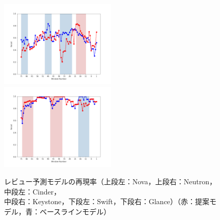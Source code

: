 \documentclass[11pt]{jreport}
\begin{document}
\begin{figure}[H]
\begin{minipage}{\textwidth}
\begin{center}
    \includegraphics[width=0.495\textwidth]{Uenaka_fig/RQ2_result/Swift_review_Recall.pdf}
    \includegraphics[width=0.495\textwidth]{Uenaka_fig/RQ2_result/Glance_review_Recall.pdf}
    \caption{レビュー予測モデルの再現率（上段左：Nova，上段右：Neutron，中段左：Cinder，\\ 中段右：Keystone，下段左：Swift，下段右：Glance）（赤：提案モデル，青：ベースラインモデル）}
    \label{fig:review_r}
\end{center}
\vspace{0.08\textheight}
\end{minipage}
\end{figure}
\end{document}
